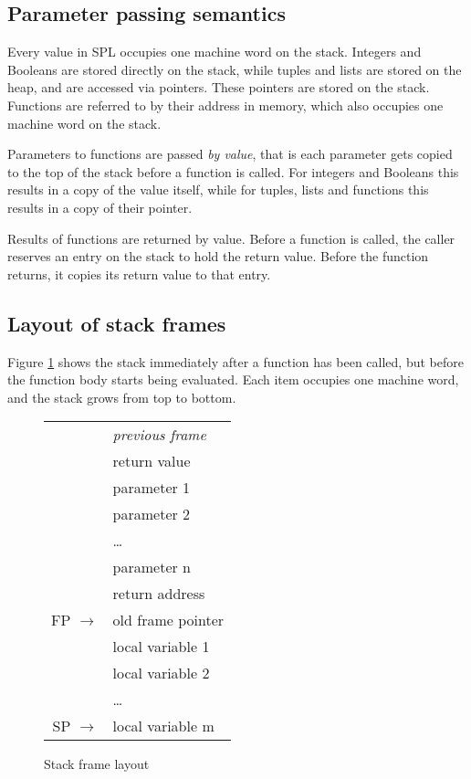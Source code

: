 \documentclass[a4paper]{article}
\newcommand{\arr}{\rightarrow}
\begin{document}
\subsection{Parameter passing semantics}

Every value in SPL occupies one machine word on the stack.  Integers and
Booleans are stored directly on the stack, while tuples and lists are stored on
the heap, and are accessed via pointers.  These pointers are stored on the
stack.  Functions are referred to by their address in memory, which also
occupies one machine word on the stack.

Parameters to functions are passed \emph{by value}, that is each parameter
gets copied to the top of the stack before a function is called.  For integers
and Booleans this results in a copy of the value itself, while for tuples, lists
and functions this results in a copy of their pointer.

Results of functions are returned by value.  Before a function is called, the
caller reserves an entry on the stack to hold  the return value.  Before the
function returns, it copies its return value to that entry.


\subsection{Layout of stack frames}

Figure \ref{fig_stackLayout} shows the stack immediately after a function has
been called, but before the function body starts being evaluated.  Each item
occupies one machine word, and the stack grows from top to bottom.

\begin{figure}[h]
\begin{center}
\begin{tabular}{r|l|}
  & \emph{previous frame} \\
  \cline{2-2}
  & return value \\
  \cline{2-2}
  & parameter 1 \\
  \cline{2-2}
  & parameter 2 \\
  \cline{2-2}
  & \ldots \\
  \cline{2-2}
  & parameter n \\
  \cline{2-2}
  & return address \\
  \cline{2-2}
  FP $\arr$ & old frame pointer \\
  \cline{2-2}
  & local variable 1 \\
  \cline{2-2}
  & local variable 2 \\
  \cline{2-2}
  & \ldots \\
  \cline{2-2}
  SP $\arr$ & local variable m \\
  \cline{2-2}
\end{tabular}
\end{center}
\caption{Stack frame layout}
\label{fig_stackLayout}
\end{figure}
\end{document}
